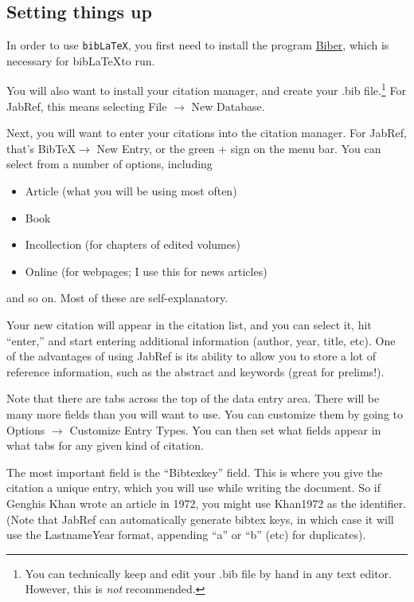 \documentclass[12pt]{article}
\begin{document}
\subsection{Setting things up}

In order to use \verb+bibLaTeX+, you first need to install the program \href{http://biblatex-biber.sourceforge.net/}{Biber}, which is necessary for bib\LaTeX to run.

You will also want to install your citation manager, and create your .bib file.\footnote{You can technically keep and edit your .bib file by hand in any text editor. However, this is {\em not} recommended.} For JabRef, this means selecting File $\rightarrow$ New Database.

Next, you will want to enter your citations into the citation manager. For JabRef, that's BibTeX$\rightarrow$ New Entry, or the green $+$ sign on the menu bar. You can select from a number of options, including
\begin{itemize}
	\item Article (what you will be using most often)
	\item Book
	\item Incollection (for chapters of edited volumes)
	\item Online (for webpages; I use this for news articles)
\end{itemize}
and so on. Most of these are self-explanatory.

Your new citation will appear in the citation list, and you can select it, hit ``enter,'' and start entering additional information (author, year, title, etc). One of the advantages of using JabRef is its ability to allow you to store a lot of reference information, such as the abstract and keywords (great for prelims!).

Note that there are tabs across the top of the data entry area. There will be many more fields than you will want to use. You can customize them by going to Options $\rightarrow$ Customize Entry Types. You can then set what fields appear in what tabs for any given kind of citation. 

The most important field is the ``Bibtexkey'' field. This is where you give the citation a unique entry, which you will use while writing the document. So if Genghis Khan wrote an article in 1972, you might use Khan1972 as the identifier. (Note that JabRef can automatically generate bibtex keys, in which case it will use the LastnameYear format, appending ``a'' or ``b'' (etc) for duplicates).
\end{document}
